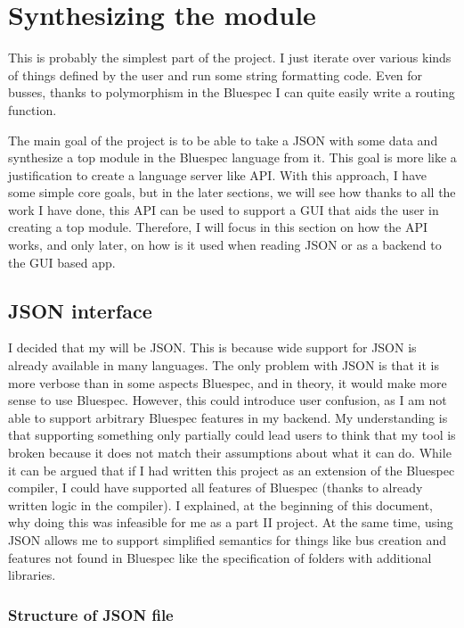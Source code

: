 \documentclass[12pt]{report}
\begin{document}
\newpage

\section{Synthesizing the module}
This is probably the simplest part of the project. I just iterate over various kinds of things defined by the user and run some string formatting code. Even for busses, thanks to polymorphism in the Bluespec I can quite easily write a routing function. 
  
  
The main goal of the project is to be able to take a JSON with some data and synthesize a top module in the Bluespec language from it. This goal is more like a justification to create a language server like API. With this approach, I have some simple core goals, but in the later sections, we will see how thanks to all the work I have done, this API can be used to support a GUI that aids the user in creating a top module. Therefore, I will focus in this section on how the API works, and only later, on how is it used when reading JSON or as a backend to the GUI based app. 
  
  
\subsection{JSON interface}
I decided that my  will be JSON. This is because wide support for JSON is already available in many languages.
The only problem with JSON is that it is more verbose than in some aspects Bluespec, and in theory, it would make more sense to use Bluespec.
However, this could introduce user confusion, as I am not able to support arbitrary Bluespec features in my backend.
My understanding is that supporting something only partially could lead users to think that my tool is broken because it does not match their assumptions about what it can do.
While it can be argued that if I had written this project as an extension of the Bluespec compiler, I could have supported all features of Bluespec (thanks to already written logic in the compiler).
I explained, at the beginning of this document, why doing this was infeasible for me as a part II project.
At the same time, using JSON allows me to support simplified semantics for things like bus creation and features not found in Bluespec like the specification of folders with additional libraries.

\newpage 

\subsubsection{Structure of JSON file}
\end{document}
